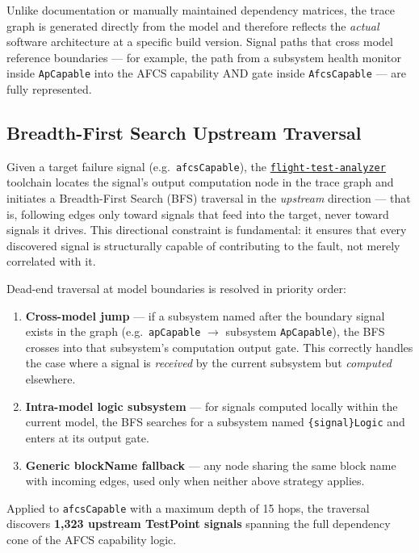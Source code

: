 \documentclass[11pt, letterpaper]{article}
\newcommand{\repoFTA}{\href{https://github.com/francis-barchesky/flight-test-analyzer}{\texttt{flight-test-analyzer}}}
\begin{document}
Unlike documentation or manually maintained dependency matrices, the trace graph
is generated directly from the model and therefore reflects the \emph{actual}
software architecture at a specific build version. Signal paths that cross model
reference boundaries --- for example, the path from a subsystem health monitor
inside \texttt{ApCapable} into the AFCS capability AND gate inside
\texttt{AfcsCapable} --- are fully represented.

\subsection{Breadth-First Search Upstream Traversal}

Given a target failure signal (e.g.\ \texttt{afcsCapable}), the \repoFTA{}
toolchain locates the signal's output computation node in the trace graph and
initiates a Breadth-First Search (BFS) traversal in the \emph{upstream}
direction --- that is, following edges only toward signals that feed into the
target, never toward signals it drives. This directional constraint is
fundamental: it ensures that every discovered signal is structurally capable of
contributing to the fault, not merely correlated with it.

Dead-end traversal at model boundaries is resolved in priority order:
\begin{enumerate}[itemsep=2pt]
  \item \textbf{Cross-model jump} --- if a subsystem named after the boundary
    signal exists in the graph (e.g.\ \texttt{apCapable} $\to$ subsystem
    \texttt{ApCapable}), the BFS crosses into that subsystem's computation output
    gate. This correctly handles the case where a signal is \emph{received} by
    the current subsystem but \emph{computed} elsewhere.
  \item \textbf{Intra-model logic subsystem} --- for signals computed locally
    within the current model, the BFS searches for a subsystem named
    \texttt{\{signal\}Logic} and enters at its output gate.
  \item \textbf{Generic blockName fallback} --- any node sharing the same block
    name with incoming edges, used only when neither above strategy applies.
\end{enumerate}

Applied to \texttt{afcsCapable} with a maximum depth of 15 hops, the traversal
discovers \textbf{1{,}323 upstream TestPoint signals} spanning the full
dependency cone of the AFCS capability logic.
\end{document}
